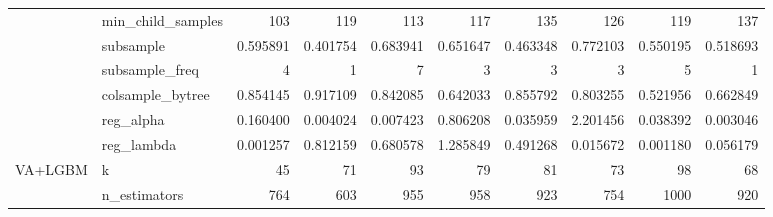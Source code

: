 \documentclass[12pt,twoside]{report}
\begin{document}
\begin{longtable}{llrrrrrrrr}
                                  & min\_child\_samples        & 103                      & 119                      & 113                      & 117                      & 135                      & 126                      & 119                      & 137                       \\*
                                  & subsample                  & 0.595891                 & 0.401754                 & 0.683941                 & 0.651647                 & 0.463348                 & 0.772103                 & 0.550195                 & 0.518693                  \\*
                                  & subsample\_freq            & 4                        & 1                        & 7                        & 3                        & 3                        & 3                        & 5                        & 1                         \\*
                                  & colsample\_bytree          & 0.854145                 & 0.917109                 & 0.842085                 & 0.642033                 & 0.855792                 & 0.803255                 & 0.521956                 & 0.662849                  \\*
                                  & reg\_alpha                 & 0.160400                 & 0.004024                 & 0.007423                 & 0.806208                 & 0.035959                 & 2.201456                 & 0.038392                 & 0.003046                  \\*
                                  & reg\_lambda                & 0.001257                 & 0.812159                 & 0.680578                 & 1.285849                 & 0.491268                 & 0.015672                 & 0.001180                 & 0.056179                  \\* 
\midrule
\multirow{10}{*}{VA+LGBM}         & k                          & 45                       & 71                       & 93                       & 79                       & 81                       & 73                       & 98                       & 68                        \\*
                                  & n\_estimators              & 764                      & 603                      & 955                      & 958                      & 923                      & 754                      & 1000                     & 920                       \\*

\end{longtable}
\end{document}

